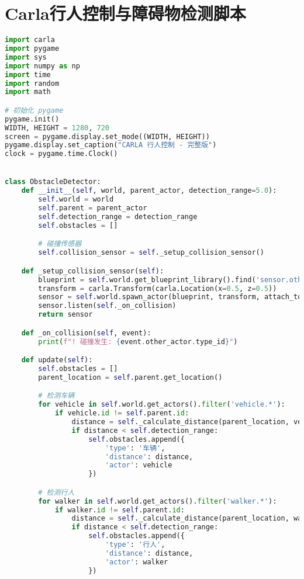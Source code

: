 \section{Carla行人控制与障碍物检测脚本}

\begin{lstlisting}[language=Python]
import carla
import pygame
import sys
import numpy as np
import time
import random
import math

# 初始化 pygame
pygame.init()
WIDTH, HEIGHT = 1280, 720
screen = pygame.display.set_mode((WIDTH, HEIGHT))
pygame.display.set_caption("CARLA 行人控制 - 完整版")
clock = pygame.time.Clock()


class ObstacleDetector:
    def __init__(self, world, parent_actor, detection_range=5.0):
        self.world = world
        self.parent = parent_actor
        self.detection_range = detection_range
        self.obstacles = []

        # 碰撞传感器
        self.collision_sensor = self._setup_collision_sensor()

    def _setup_collision_sensor(self):
        blueprint = self.world.get_blueprint_library().find('sensor.other.collision')
        transform = carla.Transform(carla.Location(x=0.5, z=0.5))
        sensor = self.world.spawn_actor(blueprint, transform, attach_to=self.parent)
        sensor.listen(self._on_collision)
        return sensor

    def _on_collision(self, event):
        print(f"! 碰撞发生: {event.other_actor.type_id}")

    def update(self):
        self.obstacles = []
        parent_location = self.parent.get_location()

        # 检测车辆
        for vehicle in self.world.get_actors().filter('vehicle.*'):
            if vehicle.id != self.parent.id:
                distance = self._calculate_distance(parent_location, vehicle.get_location())
                if distance < self.detection_range:
                    self.obstacles.append({
                        'type': '车辆',
                        'distance': distance,
                        'actor': vehicle
                    })

        # 检测行人
        for walker in self.world.get_actors().filter('walker.*'):
            if walker.id != self.parent.id:
                distance = self._calculate_distance(parent_location, walker.get_location())
                if distance < self.detection_range:
                    self.obstacles.append({
                        'type': '行人',
                        'distance': distance,
                        'actor': walker
                    })


\end{lstlisting}
